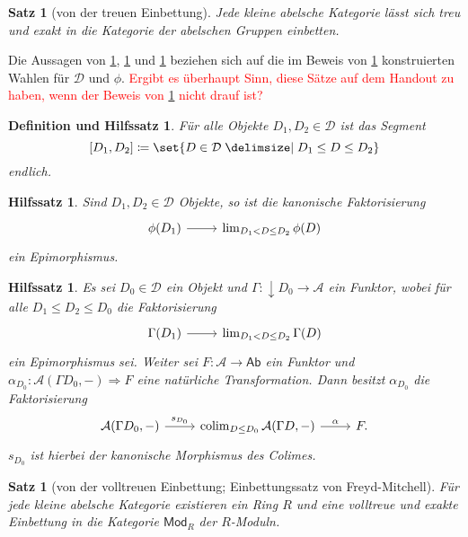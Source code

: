 \documentclass[a4paper, parskip=half]{scrartcl}
\theoremstyle{marginbreak}
\newtheorem{theorem}[remark]{Satz}
\newtheorem{lemma}[remark]{Hilfssatz}
\newtheorem{defle}[remark]{Definition und Hilfssatz}
\theoremstyle{nonumberplain}
\newtheorem{proof}{Beweis.}
\newcommand\ccat\mathsf
\newcommand\cat\mathcal
\newcommand{\down}[1]{{\downarrow}#1}
\newcommand{\p}[1]{\iftoggle{proofs}{#1}{}}
\DeclareMathOperator{\colim}{colim}
\DeclareMathOperator{\id}{id}
\begin{document}
		\p{\begin{proof}
			Es seien $f\colon A\rightrightarrows B$ Morphismen in $\cat{A}$ mit
			$U(f)=U(g)$. $a\in U(A)$ sei die Äquivalenzklasse von $\alpha\colon\phi(D)\to A$.
			Es ist$[f\circ\alpha]_\approx=U(f)(a)=U(g)(a)=[g\circ\alpha]_\approx$, also
			existiert $d\colon D'\to D$ in $\cat{D}$ mit $f\circ\alpha\circ\phi(d)=g\circ\alpha\circ\phi(d)$.

			Ist nun $\phi(\overline{D})=A$ für ein $\overline{D}\in\cat{D}$ (Voraussetzung),
			so wähle $\alpha\coloneqq\id_{A}$. Wir erhalten $f\circ \id_A\circ\phi(d)=g\circ\id_A\circ\phi(d)$.
			Nach Voraussetzung ist $\phi(d)$ ein Epimorphismus und es folgt $f=g$.
		\end{proof}}
		\begin{theorem}[von der treuen Einbettung]\label{abeb}
			Jede kleine abelsche Kategorie lässt sich treu und exakt in die Kategorie
			der abelschen Gruppen einbetten.
		\end{theorem}

		Die Aussagen von \ref{fin}, \ref{fact} und \ref{func} beziehen sich auf
		die im Beweis von \ref{abeb} konstruierten
		Wahlen für $\cat{D}$ und $\phi$. \textcolor{red}{Ergibt es überhaupt Sinn,
		diese Sätze auf dem Handout zu haben, wenn der Beweis von \ref{abeb}
		nicht drauf ist?}
		\begin{defle}\label{fin}
			Für alle Objekte $D_1,D_2\in\cat{D}$ ist das Segment
				\[
					[D_1, D_2] \coloneqq\set{D\in\cat{D}\given D_1\leq D\leq D_2}
				\]
			endlich.
		\end{defle}
		\begin{lemma}\label{fact}
			Sind $D_1, D_2\in\cat{D}$ Objekte, so ist die kanonische Faktorisierung
			\[
				\begin{tikzcd}
					\phi(D_1) \arrow[r] & \lim_{D_1<D\leq D_2}\phi(D)
				\end{tikzcd}
			\]
			ein Epimorphismus.
		\end{lemma}
		\begin{lemma}\label{func}
			Es sei $D_0\in\cat{D}$ ein Objekt und $\Gamma\colon \down{D_0}\to\cat{A}$
			ein Funktor, wobei für alle $D_1\leq D_2\leq D_0$ die Faktorisierung
			\[
				\begin{tikzcd}
					\Gamma(D_1) \arrow[r] & \lim_{D_1<D\leq D_2} \Gamma(D)
				\end{tikzcd}
			\]
			ein Epimorphismus sei. Weiter sei $F\colon\cat{A}\to\ccat{Ab}$ ein
			Funktor und $\alpha_{D_0}\colon \cat{A}(\Gamma D_0, {-})\Rightarrow F$
			eine natürliche Transformation. Dann besitzt $\alpha_{D_0}$ die
			Faktorisierung
			\[
				\begin{tikzcd}
					\cat{A}(\Gamma D_0, {-}) \arrow{r}{s_{D_0}} & \colim_{D\leq D_0}\cat{A}(\Gamma D, {-}) \arrow{r}{\alpha} & F.
				\end{tikzcd}
			\]
			$s_{D_0}$ ist hierbei der kanonische Morphismus des Colimes.
		\end{lemma}
		\begin{theorem}[von der volltreuen Einbettung; Einbettungssatz von Freyd-Mitchell]
			Für jede kleine abelsche Kategorie existieren ein Ring $R$ und eine volltreue
			und exakte Einbettung in die Kategorie $\ccat{Mod}_R$ der $R$-Moduln.
		\end{theorem}
\end{document}
